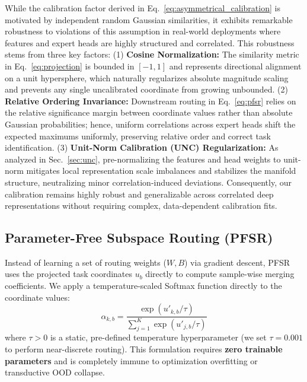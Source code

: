 While the calibration factor derived in Eq.~\ref{eq:asymmetrical_calibration} is motivated by independent random Gaussian similarities, it exhibits remarkable robustness to violations of this assumption in real-world deployments where features and expert heads are highly structured and correlated. This robustness stems from three key factors: (1) \textbf{Cosine Normalization:} The similarity metric in Eq.~\ref{eq:projection} is bounded in $[-1, 1]$ and represents directional alignment on a unit hypersphere, which naturally regularizes absolute magnitude scaling and prevents any single uncalibrated coordinate from growing unbounded. (2) \textbf{Relative Ordering Invariance:} Downstream routing in Eq.~\ref{eq:pfsr} relies on the relative significance margin between coordinate values rather than absolute Gaussian probabilities; hence, uniform correlations across expert heads shift the expected maximums uniformly, preserving relative order and correct task identification. (3) \textbf{Unit-Norm Calibration (UNC) Regularization:} As analyzed in Sec.~\ref{sec:unc}, pre-normalizing the features and head weights to unit-norm mitigates local representation scale imbalances and stabilizes the manifold structure, neutralizing minor correlation-induced deviations. Consequently, our calibration remains highly robust and generalizable across correlated deep representations without requiring complex, data-dependent calibration fits.

\subsection{Parameter-Free Subspace Routing (PFSR)}
Instead of learning a set of routing weights ($W, B$) via gradient descent, PFSR uses the projected task coordinates $u_b$ directly to compute sample-wise merging coefficients. We apply a temperature-scaled Softmax function directly to the coordinate values:
\begin{equation}
\alpha_{k, b} = \frac{\exp(u'_{k, b} / \tau)}{\sum_{j=1}^K \exp(u'_{j, b} / \tau)}
\label{eq:pfsr}
\end{equation}
where $\tau > 0$ is a static, pre-defined temperature hyperparameter (we set $\tau = 0.001$ to perform near-discrete routing). This formulation requires \textbf{zero trainable parameters} and is completely immune to optimization overfitting or transductive OOD collapse.

